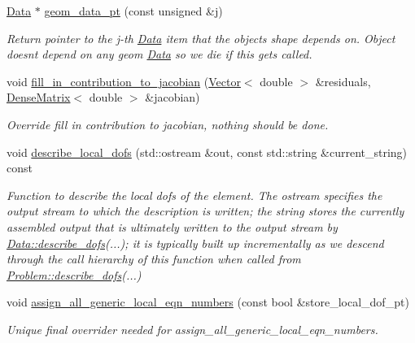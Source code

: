 \begin{DoxyCompactItemize}
\hyperlink{classoomph_1_1Data}{Data} $\ast$ \hyperlink{classoomph_1_1FaceElementAsGeomObject_ac086288f59f368278b08894a00e990fa}{geom\+\_\+data\+\_\+pt} (const unsigned \&j)
\begin{DoxyCompactList}\small\item\em Return pointer to the j-\/th \hyperlink{classoomph_1_1Data}{Data} item that the object\textquotesingle{}s shape depends on. Object doesn\textquotesingle{}t depend on any geom \hyperlink{classoomph_1_1Data}{Data} so we die if this gets called. \end{DoxyCompactList}\item 
void \hyperlink{classoomph_1_1FaceElementAsGeomObject_a2835ee6ef417ec603c39a1f0f4e356f0}{fill\+\_\+in\+\_\+contribution\+\_\+to\+\_\+jacobian} (\hyperlink{classoomph_1_1Vector}{Vector}$<$ double $>$ \&residuals, \hyperlink{classoomph_1_1DenseMatrix}{Dense\+Matrix}$<$ double $>$ \&jacobian)
\begin{DoxyCompactList}\small\item\em Override fill in contribution to jacobian, nothing should be done. \end{DoxyCompactList}\item 
void \hyperlink{classoomph_1_1FaceElementAsGeomObject_a13703c5fac7edda661a3c5cd1f22b9fd}{describe\+\_\+local\+\_\+dofs} (std\+::ostream \&out, const std\+::string \&current\+\_\+string) const
\begin{DoxyCompactList}\small\item\em Function to describe the local dofs of the element. The ostream specifies the output stream to which the description is written; the string stores the currently assembled output that is ultimately written to the output stream by \hyperlink{classoomph_1_1Data_a2dae16e2dcff9a40029f834c83364df5}{Data\+::describe\+\_\+dofs}(...); it is typically built up incrementally as we descend through the call hierarchy of this function when called from \hyperlink{classoomph_1_1Problem_abc103804eb319ae0b3d43870cc3e1eaf}{Problem\+::describe\+\_\+dofs}(...) \end{DoxyCompactList}\item 
void \hyperlink{classoomph_1_1FaceElementAsGeomObject_a744885ae07ad0e4091d43dd349aa699a}{assign\+\_\+all\+\_\+generic\+\_\+local\+\_\+eqn\+\_\+numbers} (const bool \&store\+\_\+local\+\_\+dof\+\_\+pt)
\begin{DoxyCompactList}\small\item\em Unique final overrider needed for assign\+\_\+all\+\_\+generic\+\_\+local\+\_\+eqn\+\_\+numbers. \end{DoxyCompactList}\end{DoxyCompactItemize}

